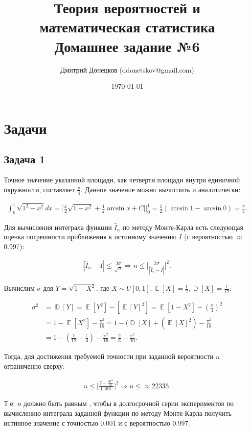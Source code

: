 \documentclass[a4paper,11pt]{article}
\title{\vspace{-1.5cm}Теория вероятностей и математическая статистика \\
Домашнее задание №6}
\author{Дмитрий Донецков (ddonetskov@gmail.com)}
\date{\today}
\DeclareMathOperator*{\D}{\mathbb{D}}   %
\DeclareMathOperator*{\E}{\mathbb{E}}   %
\begin{document}
\maketitle

\section{Задачи}

\subsection{Задача 1}

Точное значение указанной площади, как четверти площади внутри единичной окружности, составляет $\frac{\pi}{4}$. Данное значение можно вычислить и аналитически:

\begin{align*}
\int_{0}^{1} \sqrt{1^2 - x^2}dx 
= \bigg[\frac{x}{2}\sqrt{1-x^2} + \frac{1}{2}\arcsin{x} + C\bigg]\bigg\rvert_0^1
= \frac{1}{2}(\arcsin{1} - \arcsin{0}) = \frac{\pi}{4}.
\end{align*}

Для вычисления интеграла функции $\hat{I}_n$ по методу Монте-Карла есть следующая оценка погрешности приближения к истинному значению $I$ (с вероятностью $\approx$ 0.997):

\begin{align*}
|\hat{I}_n - I| \leq \frac{3\sigma}{\sqrt{n}}
\Rightarrow
n \leq \bigg[\frac{3\sigma}{|\hat{I}_n - I|}\bigg]^2.
\end{align*}

Вычислим $\sigma$ для $Y = \sqrt{1-X^2}$, где $X \sim U[0,1], \E[X] = \frac{1}{2}, \D[X] = \frac{1}{12}$:

\begin{align*}
\sigma^2 &= \D[Y] = \E[Y^2] - [\E[Y]^2] = \E[1-X^2] - (\frac{\pi}{4})^2 \\
&= 1 - \E[X^2] - \frac{\pi^2}{16} = 1 - (\D[X] + (\E[X]^2) - \frac{\pi^2}{16} \\
&= 1 - (\frac{1}{12} + \frac{1}{4}) - \frac{\pi^2}{16} = \frac{2}{3} - \frac{\pi^2}{16}.
\end{align*}

Тогда, для достижения требуемой точности при заданной вероятности $n$ ограниченно сверху:

\begin{align*}
n \leq \bigg[\frac{2-\frac{3\pi^2}{16}}{0.001}\bigg]^2 \Rightarrow
n \leq \approx 22335.
\end{align*}

Т.е. $n$ должно быть равным , чтобы в долгосрочной серии экспериментов по вычислению интеграла заданной функции по методу Монте-Карла получить истинное значение с точностью 0.001 и с вероятностью 0.997.
\end{document}
